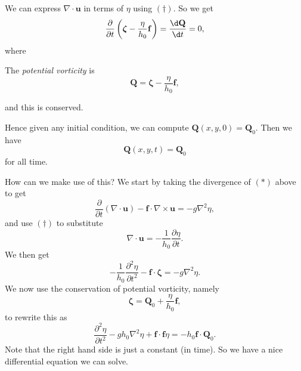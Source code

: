 \documentclass[a4paper]{article}
\begin{document}
We can express $\nabla \cdot \mathbf{u}$ in terms of $\eta$ using $(\dagger)$. So we get
\[
  \frac{\partial}{\partial t}\left(\boldsymbol\zeta - \frac{\eta}{h_0}\mathbf{f}\right) = \frac{\d \mathbf{Q}}{\d t} = 0,
\]
where
\begin{defi}
  The \emph{potential vorticity} is
  \[
    \mathbf{Q} = \boldsymbol\zeta - \frac{\eta}{h_0}\mathbf{f},
  \]
\end{defi}
and this is conserved.

Hence given any initial condition, we can compute $\mathbf{Q}(x, y, 0) = \mathbf{Q}_0$. Then we have
\[
  \mathbf{Q}(x, y, t) = \mathbf{Q}_0
\]
for all time.

How can we make use of this? We start by taking the divergence of $(*)$ above to get
\[
  \frac{\partial}{\partial t}(\nabla \cdot \mathbf{u}) - \mathbf{f} \cdot \nabla \times \mathbf{u} = - g \nabla^2 \eta,
\]
and use $(\dagger)$ to substitute
\[
  \nabla \cdot \mathbf{u} = -\frac{1}{h_0} \frac{\partial \eta}{\partial t}.
\]
We then get
\[
  -\frac{1}{h_0} \frac{\partial^2 \eta}{\partial t^2} - \mathbf{f}\cdot \boldsymbol\zeta = -g\nabla^2 \eta.
\]
We now use the conservation of potential vorticity, namely
\[
  \boldsymbol\zeta = \mathbf{Q}_0 + \frac{\eta}{h_0}\mathbf{f},
\]
to rewrite this as
\[
  \frac{\partial^2 \eta}{\partial t^2} - gh_0 \nabla^2 \eta + \mathbf{f}\cdot \mathbf{f} \eta = - h_0 \mathbf{f}\cdot \mathbf{Q}_0.
\]
Note that the right hand side is just a constant (in time). So we have a nice differential equation we can solve.
\end{document}
